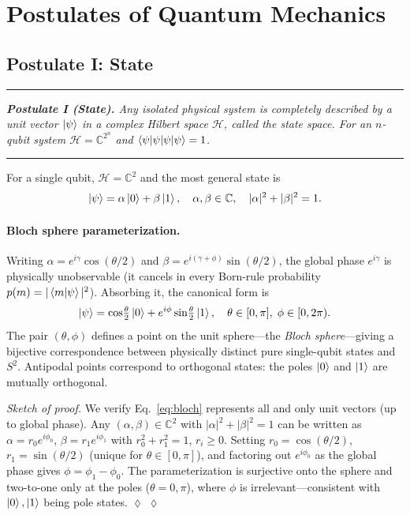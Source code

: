 \documentclass[aps, reprint, twocolumn, superscriptaddress, floatfix]{revtex4-2}
\newenvironment{statement}{%
  \par\addvspace{5pt}%
  \noindent\rule{\linewidth}{0.4pt}\nopagebreak\par\vspace{2pt}%
  \noindent\begingroup\small\itshape}{%
  \endgroup\par\vspace{2pt}\nopagebreak%
  \noindent\rule{\linewidth}{0.4pt}\par\addvspace{5pt}}
\newenvironment{proofsketch}[1][Sketch of proof]{%
  \par\smallskip\noindent\textit{#1.}\enspace}{%
  \hspace*{\fill}$\lozenge$\par\smallskip}
\begin{document}
\section{Postulates of Quantum Mechanics}
\label{sec:postulates}

\subsection{Postulate I: State}
\label{ssec:state}

\begin{statement}
\textbf{Postulate I (State).}
Any isolated physical system is completely described by a unit vector
$\ket{\psi}$ in a complex Hilbert space $\mathcal{H}$, called the state space.
For an $n$-qubit system $\mathcal{H}=\mathbb{C}^{2^n}$ and $\braket{\psi|\psi}=1$.
\end{statement}

For a single qubit, $\mathcal{H} = \mathbb{C}^2$ and the most general state is
\begin{equation}
  \ket{\psi} = \alpha\ket{0} + \beta\ket{1}, \quad
  \alpha,\beta \in \mathbb{C}, \quad
  |\alpha|^2 + |\beta|^2 = 1.
  \label{eq:qubit}
\end{equation}

\paragraph{Bloch sphere parameterization.}
Writing $\alpha = e^{i\gamma}\cos(\theta/2)$ and
$\beta = e^{i(\gamma+\phi)}\sin(\theta/2)$, the global phase $e^{i\gamma}$ is
physically unobservable (it cancels in every Born-rule probability
$p(m)=|\bra{m}\ket{\psi}|^2$).  Absorbing it, the canonical form is
\begin{equation}
  \ket{\psi} = \cos\!\tfrac{\theta}{2}\ket{0} + e^{i\phi}\sin\!\tfrac{\theta}{2}\ket{1},
  \quad \theta \in [0,\pi],\;\phi \in [0,2\pi).
  \label{eq:bloch}
\end{equation}
The pair $(\theta,\phi)$ defines a point on the unit sphere---the
\emph{Bloch sphere}---giving a bijective correspondence between physically
distinct pure single-qubit states and $S^2$.  Antipodal points correspond to
orthogonal states: the poles $\ket{0}$ and $\ket{1}$ are mutually orthogonal.

\begin{proofsketch}
We verify Eq.~\eqref{eq:bloch} represents all and only unit vectors (up to global phase).
Any $(\alpha,\beta) \in \mathbb{C}^2$ with $|\alpha|^2+|\beta|^2=1$ can be written
as $\alpha = r_0 e^{i\phi_0}$, $\beta = r_1 e^{i\phi_1}$ with $r_0^2+r_1^2=1$, $r_i\ge 0$.
Setting $r_0=\cos(\theta/2)$, $r_1=\sin(\theta/2)$ (unique for $\theta\in[0,\pi]$),
and factoring out $e^{i\phi_0}$ as the global phase gives $\phi = \phi_1-\phi_0$.
The parameterization is surjective onto the sphere and two-to-one only at the poles
($\theta=0,\pi$), where $\phi$ is irrelevant---consistent with $\ket{0},\ket{1}$
being pole states. $\lozenge$
\end{proofsketch}
\end{document}
